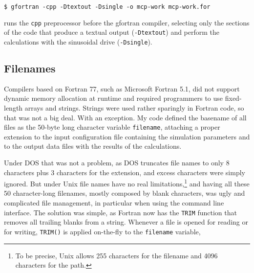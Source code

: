 \begin{lstlisting}
$ gfortran -cpp -Dtextout -Dsingle -o mcp-work mcp-work.for
\end{lstlisting}

runs the \texttt{cpp} preprocessor before the gfortran compiler, selecting only the sections of the code that produce a textual output (\texttt{-Dtextout}) and perform the calculations with the sinusoidal drive (\texttt{-Dsingle}).



\subsection{Filenames}

Compilers based on Fortran 77, such as Microsoft Fortran 5.1, did not support dynamic memory allocation at runtime and required programmers to use fixed-length arrays and strings. Strings were used rather sparingly in Fortran code, so that was not a big deal. With an exception. 
My code defined the basename of all files as the 50-byte long character variable \texttt{filename},
%
%
attaching a proper extension to the input configuration file containing the simulation parameters and to the output data files with the results of the calculations.

Under DOS that was not a problem, as DOS truncates file names to only 8 characters plus 3 characters for the extension, and excess characters were simply ignored. But under Unix file names have no real limitations,\footnote{To be precise, Unix allows 255 characters for the filename and 4096 characters for the path.} and having all these 50 character-long filenames, mostly composed by blank characters, was ugly and complicated file management, in particular when using the command line interface.
The solution was simple, as Fortran now has the \texttt{TRIM} function that removes all trailing blanks from a string. 
Whenever a file is opened for reading or for writing, \texttt{TRIM()} is applied on-the-fly to the \texttt{filename} variable,

